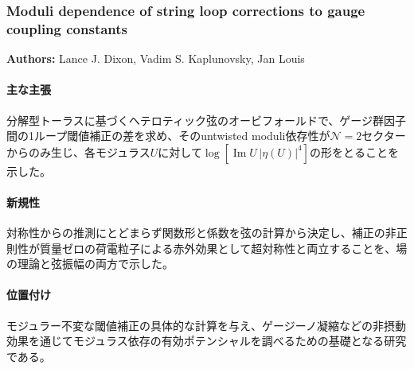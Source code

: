 \subsubsection{Moduli dependence of string loop corrections to gauge coupling constants}

\textbf{Authors:} Lance J. Dixon, Vadim S. Kaplunovsky, Jan Louis

\paragraph{主な主張}
分解型トーラスに基づくヘテロティック弦のオービフォールドで、ゲージ群因子間の1ループ閾値補正の差を求め、そのuntwisted moduli依存性が$\mathcal{N}=2$セクターからのみ生じ、各モジュラス$U$に対して$\log[\operatorname{Im}U\,|\eta(U)|^4]$の形をとることを示した\cite{Dixon:1991Thresholds}。

\paragraph{新規性}
対称性からの推測にとどまらず関数形と係数を弦の計算から決定し、補正の非正則性が質量ゼロの荷電粒子による赤外効果として超対称性と両立することを、場の理論と弦振幅の両方で示した。

\paragraph{位置付け}
モジュラー不変な閾値補正の具体的な計算を与え、ゲージーノ凝縮などの非摂動効果を通じてモジュラス依存の有効ポテンシャルを調べるための基礎となる研究である。
